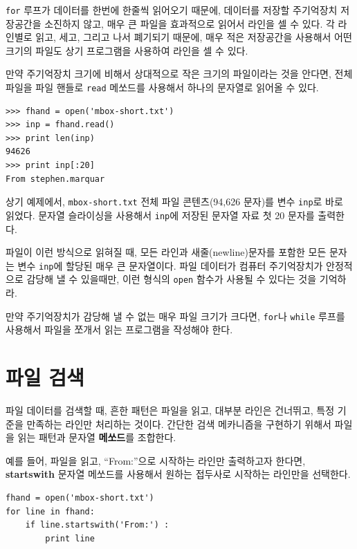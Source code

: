 {\tt for} 루프가 데이터를 한번에 한줄씩 읽어오기 때문에, 데이터를 저장할 주기억장치 저장공간을 소진하지 않고, 매우 큰 파일을 효과적으로 읽어서 라인을 셀 수 있다.
각 라인별로 읽고, 세고, 그리고 나서 폐기되기 때문에, 매우 적은 저장공간을 사용해서 어떤 크기의 파일도 상기 프로그램을 사용하여 라인을 셀 수 있다.

만약 주기억장치 크기에 비해서 상대적으로 작은 크기의 파일이라는 것을 안다면, 
전체 파일을 파일 핸들로 {\tt read} 메쏘드를 사용해서 하나의 문자열로 읽어올 수 있다.

\beforeverb
\begin{verbatim}
>>> fhand = open('mbox-short.txt')
>>> inp = fhand.read()
>>> print len(inp)
94626
>>> print inp[:20]
From stephen.marquar
\end{verbatim}
\afterverb
%

상기 예제에서, {\tt mbox-short.txt} 전체 파일 콘텐츠(94,626 문자)를 변수 {\tt inp}로 바로 읽었다.
문자열 슬라이싱을 사용해서 {\tt inp}에 저장된 문자열 자료 첫 20 문자를 출력한다.

파일이 이런 방식으로 읽혀질 때, 모든 라인과 새줄(newline)문자를 포함한 모든 문자는 변수 {\tt inp}에 할당된 매우 큰 문자열이다.
파일 데이터가 컴퓨터 주기억장치가 안정적으로 감당해 낼 수 있을때만, 
이런 형식의 {\tt open} 함수가 사용될 수 있다는 것을 기억하라.

만약 주기억장치가 감당해 낼 수 없는 매우 파일 크기가 크다면, {\tt for}나 {\tt while} 루프를 사용해서 파일을 쪼개서 읽는 프로그램을 작성해야 한다.

\section{파일 검색}

파일 데이터를 검색할 때, 흔한 패턴은 파일을 읽고, 대부분 라인은 건너뛰고, 특정 기준을 만족하는 라인만 처리하는 것이다.
간단한 검색 메카니즘을 구현하기 위해서 파일을 읽는 패턴과 문자열 {\bf 메쏘드}를 조합한다.


예를 들어, 파일을 읽고, ``From:''으로 시작하는 라인만 출력하고자 한다면, 
{\bf startswith} 문자열 메쏘드를 사용해서 원하는 접두사로 시작하는 라인만을 선택한다.

\beforeverb
\begin{verbatim}
fhand = open('mbox-short.txt')
for line in fhand:
    if line.startswith('From:') :
        print line
\end{verbatim}
\afterverb
%

